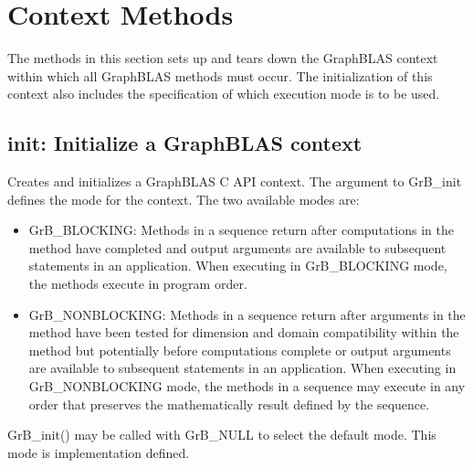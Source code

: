 \section{Context Methods}

The methods in this section sets up and tears down the GraphBLAS
context within which all GraphBLAS methods must occur.  The initialization
of this context also includes the specification of which execution mode is
to be used.

\subsection{{\sf init}: Initialize a GraphBLAS context}

Creates and initializes a GraphBLAS C API context.  The argument
to {\sf GrB\_init} defines the mode for the context.  The two
available modes are:

\begin{itemize}
\item {\sf GrB\_BLOCKING}: Methods in a sequence return after
computations in the method have completed and output arguments
are available to subsequent statements in an application.  When
executing in {\sf GrB\_BLOCKING} mode, the methods execute 
in program order.

\item {\sf GrB\_NONBLOCKING}: Methods in a sequence return after
arguments in the method have been tested for dimension and domain compatibility within the
method but potentially before computations complete or output 
arguments are available to subsequent statements in an application.
When executing in {\sf GrB\_NONBLOCKING} mode, the methods 
in a sequence may execute in any order that preserves the 
mathematically result defined by the sequence.

\end{itemize}

{\sf GrB\_init()} may be called with {\sf GrB\_NULL} to select 
the default mode.  This mode is implementation defined.


\paragraph{\syntax}

